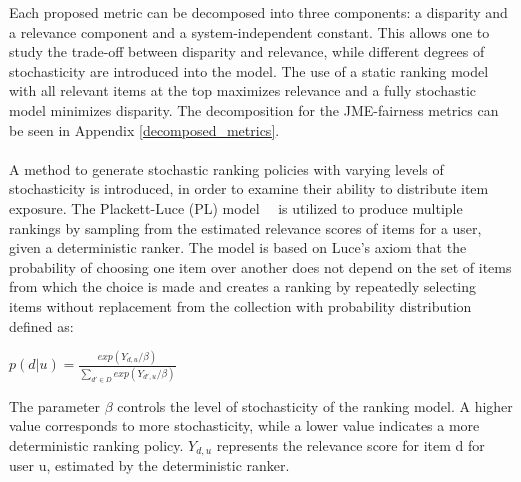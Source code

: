 Each proposed metric can be decomposed into three components: a disparity and a relevance component and a system-independent constant. This allows one to study the trade-off between disparity and relevance, while different degrees of stochasticity are introduced into the model. The use of a static ranking model with all relevant items at the top maximizes relevance and a fully stochastic model minimizes disparity. The decomposition for the JME-fairness metrics can be seen in Appendix \ref{decomposed_metrics}.
\\ \\
A method to generate stochastic ranking policies with varying levels of stochasticity is introduced, in order to examine their ability to distribute item exposure. The Plackett-Luce (PL) model~\cite{Luce59}~\cite{plackett} is utilized to produce multiple rankings by sampling from the estimated relevance scores of items for a user, given a deterministic ranker. The model is based on Luce's axiom that the probability of choosing one item over another does not depend on the set of items from which the choice is made \cite{Luce59} \cite{Luce1977TheCA} and creates a ranking by repeatedly selecting items without replacement from the collection with probability distribution defined as: 
\begin{center}
$p(d|u) = \frac{exp(Y_{d,u}/\beta)}{\sum_{d' \in D} exp(Y_{d',u}/\beta)}$
\end{center}
The parameter $\beta$ controls the level of stochasticity of the ranking model. A higher value corresponds to more stochasticity, while a lower value indicates a more deterministic ranking policy. $Y_{d,u}$ represents the relevance score for item d for user u, estimated by the deterministic ranker.

